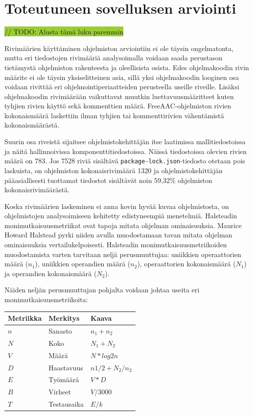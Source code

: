 \documentclass[utf8]{gradu3}
\begin{document}
\chapter{Toteutuneen sovelluksen arviointi}

\colorbox{YellowGreen}{// TODO: Alusta tämä luku paremmin}

Rivimäärien käyttäminen ohjelmiston arviointiin ei ole täysin ongelmatonta, mutta eri tiedostojen rivimääriä analysoimalla voidaan saada perustason tietämystä ohjelmiston rakenteesta ja oleellisista osista. Edes ohjelmakoodin rivin määrite ei ole täysin yksiselitteinen asia, sillä yksi ohjelmakoodin looginen osa voidaan rivittää eri ohjelmointiperiaatteiden perusteella useille riveille. Lisäksi ohjelmakoodin rivimäärään vaikuttavat muutkin luettavuusmääritteet kuten tyhjien rivien käyttö sekä kommenttien määrä. FreeAAC-ohjelmiston rivien kokonaismäärä laskettiin ilman tyhjien tai kommenttirivien vähentämistä kokonaismäärästä.

Suurin osa riveistä sijaitsee ohjelmistokehittäjän itse laatimissa mallitiedostoissa ja näitä hallinnoivissa komponenttitiedostoissa. Näissä tiedostoissa olevien rivien määrä on 783. Jos 7528 riviä sisältävä \texttt{package-lock.json}-tiedosto otetaan pois laskuista, on ohjelmiston kokonaisrivimäärä 1320 ja ohjelmistokehittäjän pääasiallisesti tuottamat tiedostot sisältävät noin 59,32\% ohjelmiston kokonaisrivimäärästä.

Koska rivimäärien laskeminen ei anna kovin hyvää kuvaa ohjelmistosta, on ohjelmistojen analysoimiseen kehitetty edistyneempiä menetelmiä. Halsteadin monimutkaisuusmetriikat ovat tapoja mitata ohjelman ominaisuuksia. Maurice Howard Halstead pyrki niiden avulla muodostamaan tavan mitata ohjelman ominaisuuksia vertailukelpoisesti. Halsteadin monimutkaisuusmetriikoiden muodostamista varten tarvitaan neljä perusmuuttujaa: uniikkien operaattorien määrä ($n_1$), uniikkien operandien määrä ($n_2$), operaattorien kokonaismäärä ($N_1$) ja operandien kokonaismäärä ($N_2$).

Näiden neljän perusmuuttujan pohjalta voidaan johtaa useita eri monimutkaisuusmetriikoita:

\begin{center}
    \begin{tabular}{ | l | l | l |}
    \hline
    \textbf{Metriikka} & \textbf{Merkitys} & \textbf{Kaava} \\ \hline
    $n$ & Sanasto & $n_1 + n_2$ \\ \hline
    $N$ & Koko & $N_1 + N_2$ \\ \hline
    $V$ & Määrä & $N * log2 n$ \\ \hline
    $D$ & Haastavuus & $n1/2 + N_2/n_2$ \\ \hline
    $E$ & Työmäärä & $V * D$ \\ \hline
    $B$ & Virheet & $V / 3000$ \\ \hline
    $T$ & Testausaika & $E / k$ \\ \hline
    \end{tabular}
\end{center}
\end{document}
